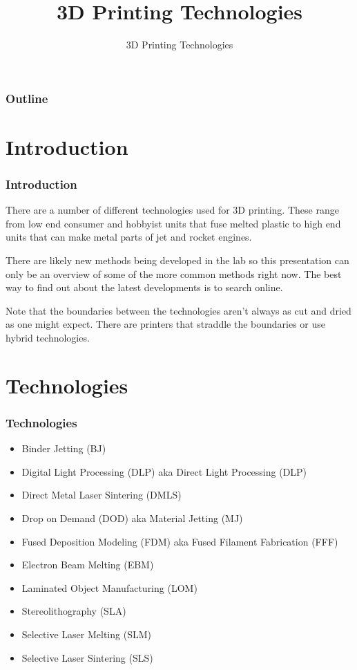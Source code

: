 \documentclass[english,10pt]{beamer}
\title{3D Printing Technologies}
\subtitle{3D Printing Technologies}
\begin{document}
\begin{frame}
  \titlepage
\end{frame}

\begin{frame}
  \frametitle{Outline}
  \tableofcontents
\end{frame}

\section{Introduction}
\begin{frame}
  \frametitle{Introduction}
  There are a number of different technologies used for 3D printing.  These range from low end consumer and hobbyist units that fuse melted plastic to high end units that can make metal parts of jet and rocket engines.

  There are likely new methods being developed in the lab so this presentation can only be an overview of some of the more common methods right now.  The best way to find out about the latest developments is to search online.  

  Note that the boundaries between the technologies aren't always as cut and dried as one might expect.  There are printers that straddle the boundaries or use hybrid technologies.
\end{frame}

\section{Technologies}
\begin{frame}
  \frametitle{Technologies}
  \begin{itemize}
    \item Binder Jetting (BJ)
    \item Digital Light Processing (DLP) aka Direct Light Processing (DLP)
    \item Direct Metal Laser Sintering (DMLS)
    \item Drop on Demand (DOD) aka Material Jetting (MJ)
    \item Fused Deposition Modeling (FDM) aka Fused Filament Fabrication (FFF)
    \item Electron Beam Melting (EBM)
    \item Laminated Object Manufacturing (LOM)
    \item Stereolithography (SLA)
    \item Selective Laser Melting (SLM)
    \item Selective Laser Sintering (SLS)
  \end{itemize}
\end{frame}
\end{document}
